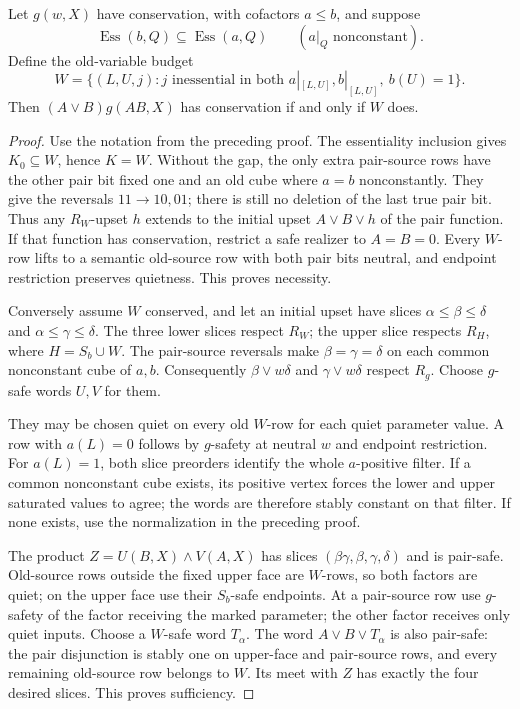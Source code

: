\begin{lemma}
\label{core:lem:conservation-pair-common-budget}
Let $g(w,X)$ have conservation, with cofactors $a\leq b$, and suppose
\[
 \operatorname{Ess}(b,Q)\subseteq\operatorname{Ess}(a,Q)
 \qquad(a|_Q\text{ nonconstant}).
\]
Define the old-variable budget
\[
 W=\{(L,U,j):j\text{ inessential in both }a|_{[L,U]},b|_{[L,U]},
                         \ b(U)=1\}.
\]
Then $(A\vee B)g(AB,X)$ has conservation if and only if $W$ does.
\end{lemma}
\begin{proof}
Use the notation from the preceding proof. The essentiality inclusion
gives $K_0\subseteq W$, hence $K=W$. Without the gap, the only extra
pair-source rows have the other pair bit fixed one and an old cube
where $a=b$ nonconstantly. They give the reversals $11\to10,01$;
there is still no deletion of the last true pair bit.
Thus any $R_W$-upset $h$ extends to the initial upset $A\vee B\vee h$
of the pair function. If that function has conservation, restrict a
safe realizer to $A=B=0$. Every $W$-row lifts to a semantic old-source
row with both pair bits neutral, and endpoint restriction preserves
quietness. This proves necessity.

Conversely assume $W$ conserved, and let an initial upset have slices
$\alpha\leq\beta\leq\delta$ and $\alpha\leq\gamma\leq\delta$.
The three lower slices respect $R_W$; the upper slice respects
$R_H$, where $H=S_b\cup W$. The pair-source reversals make
$\beta=\gamma=\delta$ on each common nonconstant cube of $a,b$.
Consequently $\beta\vee w\delta$ and $\gamma\vee w\delta$
respect $R_g$. Choose $g$-safe words $U,V$ for them.

They may be chosen quiet on every old $W$-row for each quiet parameter
value. A row with $a(L)=0$ follows by $g$-safety at neutral $w$ and
endpoint restriction. For $a(L)=1$, both slice preorders identify
the whole $a$-positive filter. If a common nonconstant cube exists,
its positive vertex forces the lower and upper saturated values to
agree; the words are therefore stably constant on that filter.
If none exists, use the normalization in the preceding proof.

The product $Z=U(B,X)\wedge V(A,X)$ has slices
$(\beta\gamma,\beta,\gamma,\delta)$ and is pair-safe. Old-source rows
outside the fixed upper face are $W$-rows, so both factors are quiet;
on the upper face use their $S_b$-safe endpoints. At a pair-source
row use $g$-safety of the factor receiving the marked parameter; the
other factor receives only quiet inputs. Choose a $W$-safe word
$T_\alpha$. The word $A\vee B\vee T_\alpha$ is also pair-safe:
the pair disjunction is stably one on upper-face and pair-source rows,
and every remaining old-source row belongs to $W$.
Its meet with $Z$ has exactly the four desired slices. This proves
sufficiency.
\end{proof}

